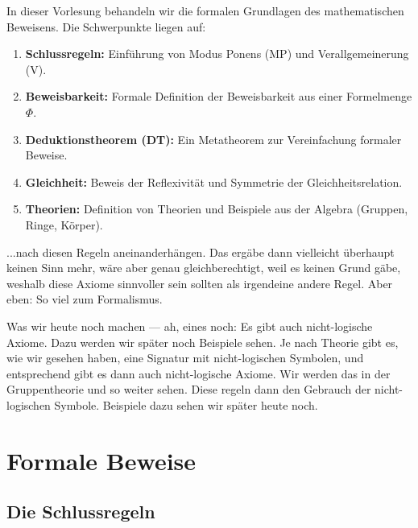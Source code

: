 
\begin{nice-box}
In dieser Vorlesung behandeln wir die formalen Grundlagen des mathematischen Beweisens. Die Schwerpunkte liegen auf:
\begin{enumerate}[label=\textbf{\arabic*.}]
    \item \textbf{Schlussregeln:} Einführung von Modus Ponens (MP) und Verallgemeinerung (V).
    \item \textbf{Beweisbarkeit:} Formale Definition der Beweisbarkeit aus einer Formelmenge $\Phi$.
    \item \textbf{Deduktionstheorem (DT):} Ein Metatheorem zur Vereinfachung formaler Beweise.
    \item \textbf{Gleichheit:} Beweis der Reflexivität und Symmetrie der Gleichheitsrelation.
    \item \textbf{Theorien:} Definition von Theorien und Beispiele aus der Algebra (Gruppen, Ringe, Körper).
\end{enumerate}
\end{nice-box}

\begin{spoken-clean}[00:09:30 - 00:11:28]
...nach diesen Regeln aneinanderhängen. Das ergäbe dann vielleicht überhaupt keinen Sinn mehr, wäre aber genau gleichberechtigt, weil es keinen Grund gäbe, weshalb diese Axiome sinnvoller sein sollten als irgendeine andere Regel. Aber eben: So viel zum Formalismus.

Was wir heute noch machen --- ah, eines noch: Es gibt auch nicht-logische Axiome. Dazu werden wir später noch Beispiele sehen. Je nach Theorie gibt es, wie wir gesehen haben, eine Signatur mit nicht-logischen Symbolen, und entsprechend gibt es dann auch nicht-logische Axiome. Wir werden das in der Gruppentheorie und so weiter sehen. Diese regeln dann den Gebrauch der nicht-logischen Symbole. Beispiele dazu sehen wir später heute noch.
\end{spoken-clean}

\section{Formale Beweise}
\subsection{Die Schlussregeln}

